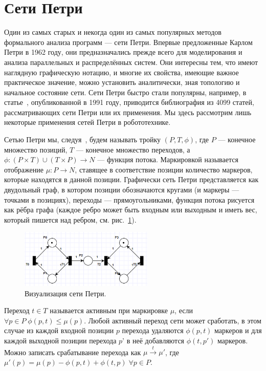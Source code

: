 \documentclass[conference]{IEEEtran}
\begin{document}
\section{Сети Петри}
Один из самых старых и некогда один из самых популярных методов формального 
анализа программ --- сети Петри. Впервые предложенные Карлом Петри в 1962 году, 
они предназначались прежде всего для моделирования и анализа параллельных и 
распределённых систем. Они интересны тем, что имеют наглядную графическую нотацию, 
и многие их свойства, имеющие важное практическое значение, можно установить 
аналитически, зная топологию и начальное состояние сети. Сети Петри быстро стали 
популярны, например, в статье~\cite{plunnecke1991bibliography}, опубликованной 
в 1991 году, приводится библиография из 4099 статей, рассматривающих сети Петри 
или их применения. Мы здесь рассмотрим лишь некоторые применения сетей Петри 
в робототехнике.

Сетью Петри мы, следуя~\cite{yen2006petri}, будем называть тройку $(P,T,\phi)$, 
где $P$ --- конечное множество позиций, $T$ --- конечное множество переходов, 
а $\phi:(P\times{T})\cup(T\times{P})\rightarrow{N}$ --- функция потока. Маркировкой 
называется отображение $\mu:P\rightarrow{N}$, ставящее в соответствие позиции 
количество маркеров, которые находятся в данной позиции. Графически сеть Петри 
представляется как двудольный граф, в котором позиции обозначаются кругами 
(и маркеры --- точками в позициях), переходы --- прямоугольниками, функция 
потока рисуется как рёбра графа (каждое ребро может быть входным или выходным 
и иметь вес, который пишется над ребром, см. рис.~\ref{image:petri}).

\begin{figure}[ht]
	\centering
	\includegraphics[width=2.5in]{petri.png}
	\caption{Визуализация сети Петри.}
	\label{image:petri}
\end{figure}

Переход $t\in{T}$ называется активным при маркировке $\mu$, если 
$\forall{p}\in{P}\;\phi(p,t)\le\mu(p)$. Любой активный переход сети может 
сработать, в этом случае из каждой входной позиции $p$ перехода удаляются 
$\phi(p,t)$ маркеров и для каждой выходной позиции перехода $p’$ в неё добавляются 
$\phi(t,p')$ маркеров. Можно записать срабатывание перехода как 
$\mu\stackrel{t}{\rightarrow}\mu'$, где $\mu'(p)=\mu(p)-\phi(p,t)+\phi(t,p)\;\forall{p}\in{P}$.
\end{document}
